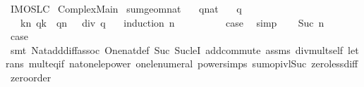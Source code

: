 %
\begin{isabellebody}%
%
%
\isadelimdocument
%
\endisadelimdocument
%
\isatagdocument
%
\isamarkuptrue%
%
\isamarkuptrue%
%
\endisatagdocument
{\isafolddocument}%
%
\isadelimdocument
%
\endisadelimdocument
%
\isadelimtheory
%
\endisadelimtheory
%
\isatagtheory
{}\isamarkupfalse%
\ IMO{\isacharunderscore}{}{}{}{}{\isacharunderscore}SL{\isacharunderscore}C{}\isanewline
{}\ Complex{\isacharunderscore}Main\isanewline
{}%
\endisatagtheory
{\isafoldtheory}%
%
\isadelimtheory
\isanewline
%
\endisadelimtheory
\isanewline
{}\isamarkupfalse%
\ sum{\isacharunderscore}geom{\isacharunderscore}nat{\isacharcolon}\isanewline
\ \ \ q{\isacharcolon}{\isacharcolon}nat\isanewline
\ \ \ {\isachardoublequoteopen}q\ {\isachargreater}\ {}{\isachardoublequoteclose}\isanewline
\ \ \ {\isachardoublequoteopen}{\isacharparenleft}{\isasymSum}k{\isasymin}{\isacharbraceleft}{}{\isachardot}{\isachardot}{\isacharless}n{\isacharbraceright}{\isachardot}\ q{\isacharcircum}k{\isacharparenright}\ {\isacharequal}\ {\isacharparenleft}q{\isacharcircum}n\ {\isacharminus}\ {}{\isacharparenright}\ div\ {\isacharparenleft}q\ {\isacharminus}\ {}{\isacharparenright}{\isachardoublequoteclose}\isanewline
%
\isadelimproof
%
\endisadelimproof
%
\isatagproof
{}\isamarkupfalse%
\ {\isacharparenleft}induction\ n{\isacharparenright}\isanewline
\ \ \isamarkupfalse%
\ {}\isanewline
\ \ \isamarkupfalse%
\ \isamarkupfalse%
\ {\isacharquery}case\ \isamarkupfalse%
\ simp\isanewline
{}\isamarkupfalse%
\isanewline
\ \ \isamarkupfalse%
\ {\isacharparenleft}Suc\ n{\isacharparenright}\isanewline
\ \ \isamarkupfalse%
\ \isamarkupfalse%
\ {\isacharquery}case\isanewline
\ \ \ \ \isamarkupfalse%
\ {\isacharparenleft}smt\ Nat{\isachardot}add{\isacharunderscore}diff{\isacharunderscore}assoc{}\ One{\isacharunderscore}nat{\isacharunderscore}def\ Suc{\isacharunderscore}{}\ Suc{\isacharunderscore}leI\ add{\isachardot}commute\ assms\ div{\isacharunderscore}mult{\isacharunderscore}self{}\ le{\isacharunderscore}trans\ mult{\isacharunderscore}eq{\isacharunderscore}if\ nat{\isacharunderscore}one{\isacharunderscore}le{\isacharunderscore}power\ one{\isacharunderscore}le{\isacharunderscore}numeral\ power{\isachardot}simps{\isacharparenleft}{}{\isacharparenright}\ sum{\isachardot}op{\isacharunderscore}ivl{\isacharunderscore}Suc\ zero{\isacharunderscore}less{\isacharunderscore}diff\ zero{\isacharunderscore}order{\isacharparenleft}{}{\isacharparenright}{\isacharparenright}\isanewline

\end{isabellebody}
